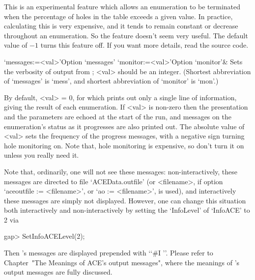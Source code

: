 This is an experimental feature which  allows  an  enumeration  to  be
terminated when the percentage of holes in the table exceeds  a  given
value. In practice, calculating this is very expensive, and  it  tends
to remain constant or  decrease  throughout  an  enumeration.  So  the
feature doesn't seem very useful. The default value of $-1$ turns this
feature off. If you want more details, read the source code.

\enditems


\beginitems

\>`messages:=<val>'{Option `messages'}
\>`monitor:=<val>'{Option `monitor'}&
Sets the verbosity of output from {\ACE}; <val> should be an integer.
(Shortest  abbreviation  of  `messages'  is   `mess',   and   shortest
abbreviation of `monitor' is `mon'.)

By default, <val> = 0, for which {\ACE} prints out only a single  line
of information, giving the result of each  enumeration.  If  <val>  is
non-zero then the presentation and the parameters are  echoed  at  the
start of the run, and messages  on  the  enumeration's  status  as  it
progresses are also printed out. The absolute value of <val> sets  the
frequency of the progress messages, with a negative sign turning  hole
monitoring on. Note that, hole monitoring is expensive, so don't  turn
it on unless you really need it.

Note   that,  ordinarily,  one   will   not   see   these    messages:
non-interactively,   these   messages    are    directed    to    file
`ACEData.outfile'   (or   <filename>,   if   option   `aceoutfile   :=
<filename>', or `ao := <filename>', is used), and interactively  these
messages are simply  not  displayed.  However,  one  can  change  this
situation both interactively and   non-interactively  by  setting  the
`InfoLevel' of `InfoACE' to 2 via

\begintt
gap> SetInfoACELevel(2);
\endtt

Then {\ACE}'s messages are  displayed  prepended  with  \lq{}`\#I  ''.
Please refer to Chapter~"The Meanings of ACE's output messages", where
the meanings of {\ACE}'s output messages are fully discussed.

\enditems


